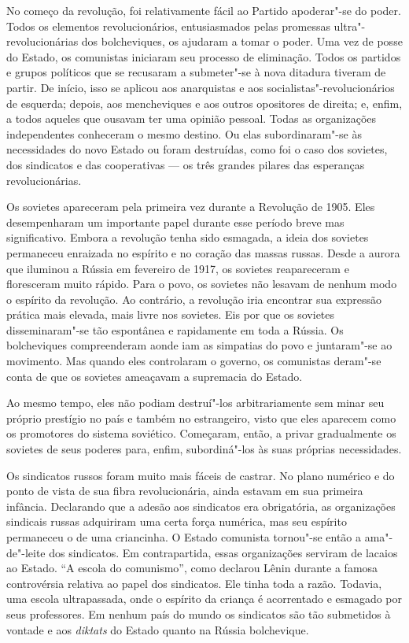 No começo da revolução, foi relativamente fácil ao Partido apoderar"-se
do poder. Todos os elementos revolucionários, entusiasmados pelas
promessas ultra"-revolucionárias dos bolcheviques, os ajudaram a tomar
o poder. Uma vez de posse do Estado, os comunistas iniciaram seu
processo de eliminação. Todos os partidos e grupos políticos que se
recusaram a submeter"-se à nova ditadura tiveram de partir. De início,
isso se aplicou aos anarquistas e aos socialistas"-revolucionários de
esquerda; depois, aos mencheviques e aos outros opositores de direita;
e, enfim, a todos aqueles que ousavam ter uma opinião pessoal. Todas as
organizações independentes conheceram o mesmo destino. Ou elas
subordinaram"-se às necessidades do novo Estado ou foram destruídas,
como foi o caso dos sovietes, dos sindicatos e das cooperativas --- os
três grandes pilares das esperanças revolucionárias.

Os sovietes apareceram pela primeira vez durante a Revolução de 1905.
Eles desempenharam um importante papel durante esse período breve mas
significativo. Embora a revolução tenha sido esmagada, a ideia dos
sovietes permaneceu enraizada no espírito e no coração das massas
russas. Desde a aurora que iluminou a Rússia em fevereiro de 1917, os
sovietes reapareceram e floresceram muito rápido. Para o povo, os
sovietes não lesavam de nenhum modo o espírito da revolução. Ao
contrário, a revolução iria encontrar sua expressão prática mais
elevada, mais livre nos sovietes. Eis por que os sovietes
disseminaram"-se tão espontânea e rapidamente em toda a Rússia. Os
bolcheviques compreenderam aonde iam as simpatias do povo e
juntaram"-se ao movimento. Mas quando eles controlaram o governo, os
comunistas deram"-se conta de que os sovietes ameaçavam a supremacia
do Estado.

Ao mesmo tempo, eles não podiam destruí"-los arbitrariamente sem minar
seu próprio prestígio no país e também no estrangeiro, visto
que eles aparecem como os promotores do sistema soviético. Começaram,
então, a privar gradualmente os sovietes de seus poderes para, enfim,
subordiná"-los às suas próprias necessidades.

Os sindicatos russos foram muito mais fáceis de castrar. No plano
numérico e do ponto de vista de sua fibra revolucionária, ainda estavam
em sua primeira infância. Declarando que a adesão aos sindicatos era
obrigatória, as organizações sindicais russas adquiriram uma certa
força numérica, mas seu espírito permaneceu o de uma criancinha. O
Estado comunista tornou"-se então a ama"-de"-leite dos sindicatos.
Em contrapartida, essas organizações serviram de lacaios ao Estado. “A
escola do comunismo”, como declarou Lênin durante a famosa controvérsia
relativa ao papel dos sindicatos. Ele tinha toda a razão. Todavia,
uma escola ultrapassada, onde o espírito da criança é acorrentado e
esmagado por seus professores. Em nenhum país do mundo os sindicatos
são tão submetidos à vontade e aos \textit{diktats} do Estado quanto na Rússia
bolchevique.

